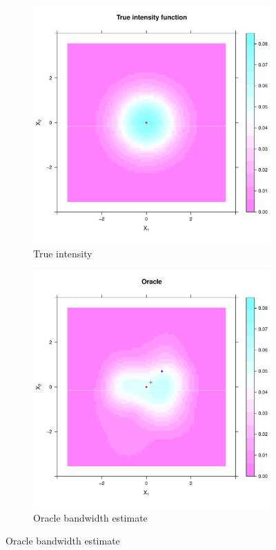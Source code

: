 \begin{figure}[htbp]
    \centering
    \begin{subfigure}[t]{0.45\textwidth}
    \includegraphics[width=\textwidth]{output/true_intensity_heatmap}
    \caption{True intensity}
    \end{subfigure}%
    \begin{subfigure}[t]{0.45\textwidth}
    \includegraphics[width=\textwidth]{output/oracle_intensity_heatmap}
    \caption{Oracle bandwidth estimate}
    \end{subfigure}



\end{figure}
